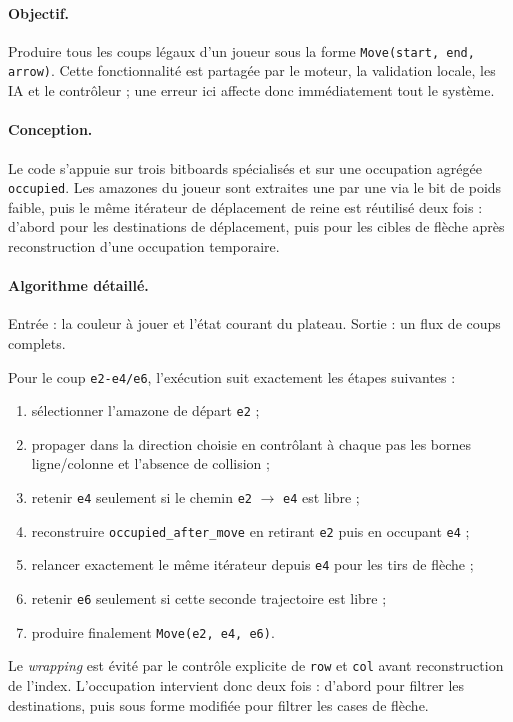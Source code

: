 \documentclass[a4paper]{article}
\begin{document}
\paragraph{Objectif.}
Produire tous les coups légaux d'un joueur sous la forme \texttt{Move(start, end, arrow)}. Cette fonctionnalité est partagée par le moteur, la validation locale, les IA et le contrôleur ; une erreur ici affecte donc immédiatement tout le système.

\paragraph{Conception.}
Le code s'appuie sur trois bitboards spécialisés et sur une occupation agrégée \texttt{occupied}. Les amazones du joueur sont extraites une par une via le bit de poids faible, puis le même itérateur de déplacement de reine est réutilisé deux fois : d'abord pour les destinations de déplacement, puis pour les cibles de flèche après reconstruction d'une occupation temporaire.

\paragraph{Algorithme détaillé.}
Entrée : la couleur à jouer et l'état courant du plateau. Sortie : un flux de coups complets.

Pour le coup \texttt{e2-e4/e6}, l'exécution suit exactement les étapes suivantes :
\begin{enumerate}
    \item sélectionner l'amazone de départ \texttt{e2} ;
    \item propager dans la direction choisie en contrôlant à chaque pas les bornes ligne/colonne et l'absence de collision ;
    \item retenir \texttt{e4} seulement si le chemin \texttt{e2} $\rightarrow$ \texttt{e4} est libre ;
    \item reconstruire \texttt{occupied\_after\_move} en retirant \texttt{e2} puis en occupant \texttt{e4} ;
    \item relancer exactement le même itérateur depuis \texttt{e4} pour les tirs de flèche ;
    \item retenir \texttt{e6} seulement si cette seconde trajectoire est libre ;
    \item produire finalement \texttt{Move(e2, e4, e6)}.
\end{enumerate}

Le \textit{wrapping} est évité par le contrôle explicite de \texttt{row} et \texttt{col} avant reconstruction de l'index. L'occupation intervient donc deux fois : d'abord pour filtrer les destinations, puis sous forme modifiée pour filtrer les cases de flèche.
\end{document}
